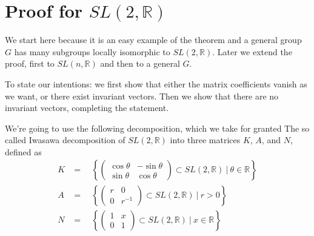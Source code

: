 \documentclass[
]{article}
\begin{document}
\hypertarget{proof-for-sln2r}{%
  \section{Proof for \texorpdfstring{$SL(2, \mathbb{R})$}{SL(2, R)}}
\label{proof-for-sln2r}}


We start here because it is an easy example of the theorem and a general
group \(G\) has many subgroups locally isomorphic to
\(SL(2, \mathbb{R})\). Later we extend the proof, first to
\(SL(n, \mathbb{R})\) and then to a general \(G\).

To state our intentions: we first show that either the matrix
coefficients vanish as we want, or there exist invariant vectors. Then
we show that there are no invariant vectors, completing the statement.

We're going to use the following decomposition, which we take for
granted 
The so called Iwasawa decomposition of \(SL(2, \mathbb{R})\) into three
matrices \(K\), \(A\), and \(N\), defined as
\begin{align}
K & =\quad \left\{ \begin{pmatrix} \cos\theta & -\sin\theta \\ \sin\theta & \cos\theta\end{pmatrix} \subset SL(2, \mathbb{R})  \ | \ \theta \in \mathbb{R} \right\} \\
A & =\quad \left\{ \begin{pmatrix} r & 0 \\ 0 & r^{-1} \end{pmatrix} \subset SL(2, \mathbb{R})  \ | \ r > 0 \right\} \\
N & =\quad \left\{ \begin{pmatrix} 1 & x \\ 0 & 1 \end{pmatrix} \subset SL(2, \mathbb{R})  \ | \ x \in \mathbb{R} \right\}\\
\end{align}
\end{document}

